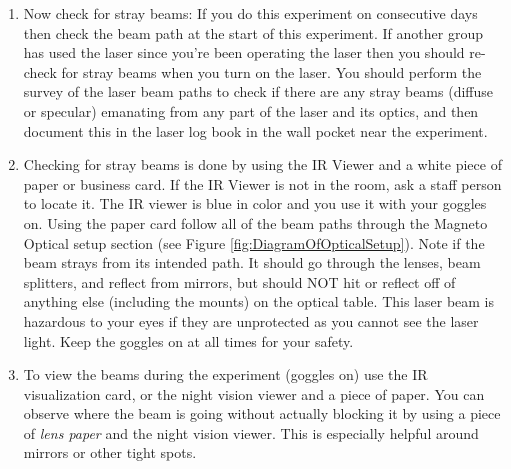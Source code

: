 \documentclass{../lab}
\begin{document}
\begin{enumerate}
    \item Now check for stray beams: If you do this experiment on consecutive days then check the beam path at the start of this experiment. If another group has used the laser since you're been operating the laser then you should re-check for stray beams when you turn on the laser. You should perform the survey of the laser beam paths to check if there are any stray beams (diffuse or specular) emanating from any part of the laser and its optics, and then document this in the laser log book in the wall pocket near the experiment.
    
    \item Checking for stray beams is done by using the IR Viewer and a white piece of paper or business card. If the IR Viewer is not in the room, ask a staff person to locate it. The IR viewer is blue in color and you use it with your goggles on. Using the paper card follow all of the beam paths through the Magneto Optical setup section (see Figure \ref{fig:DiagramOfOpticalSetup}). Note if the beam strays from its intended path. It should go through the lenses, beam splitters, and reflect from mirrors, but should NOT hit or reflect off of anything else (including the mounts) on the optical table. This laser beam is hazardous to your eyes if they are unprotected as you cannot see the laser light. Keep the goggles on at all times for your safety.
    
    \item To view the beams during the experiment (goggles on) use the IR visualization card, or the night vision viewer and a piece of paper. You can observe where the beam is going without actually blocking it by using a piece of \emph{lens paper} and the night vision viewer. This is especially helpful around mirrors or other tight spots.

    


\end{enumerate}
\end{document}
